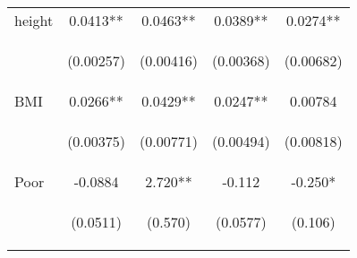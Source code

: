 \documentclass{article}[11pt,subeqn]
\begin{document}
\begin{spacing}{1.5}
\begin{table}[ht]
\begin{center}
\begin{tabular}{lcccc}
height & 0.0413** & 0.0463** & 0.0389** & 0.0274** \\
\vspace{4pt} & \begin{footnotesize}(0.00257)\end{footnotesize} & \begin{footnotesize}(0.00416)\end{footnotesize} & \begin{footnotesize}(0.00368)\end{footnotesize} & \begin{footnotesize}(0.00682)\end{footnotesize} \\
BMI & 0.0266** & 0.0429** & 0.0247** & 0.00784 \\
\vspace{4pt} & \begin{footnotesize}(0.00375)\end{footnotesize} & \begin{footnotesize}(0.00771)\end{footnotesize} & \begin{footnotesize}(0.00494)\end{footnotesize} & \begin{footnotesize}(0.00818)\end{footnotesize} \\
Poor & -0.0884 & 2.720** & -0.112 & -0.250* \\
\vspace{4pt} & \begin{footnotesize}(0.0511)\end{footnotesize} & \begin{footnotesize}(0.570)\end{footnotesize} & \begin{footnotesize}(0.0577)\end{footnotesize} & \begin{footnotesize}(0.106)\end{footnotesize} \\

\end{tabular}
\end{center}
\end{table}
\end{spacing}
\end{document}
